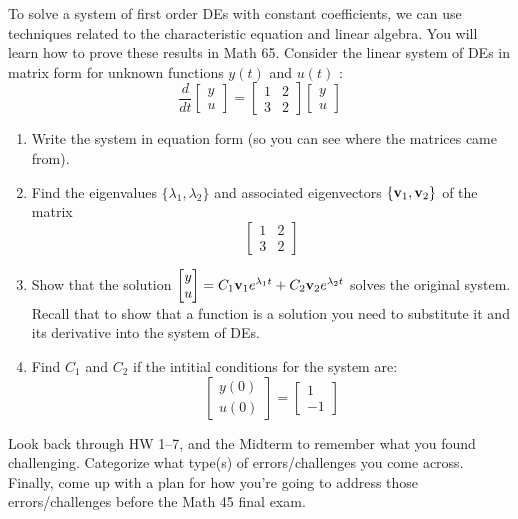 \begin{problem}[5]
To solve a system of first order DEs with constant coefficients, we can use techniques related to the characteristic equation and linear algebra. You will learn how to prove these results in Math 65. Consider the linear system of DEs in matrix form for unknown functions $y(t)$ and $u(t)$ :
\[\frac d{dt} \begin{bmatrix}y\\u\end{bmatrix} = \begin{bmatrix}1&2\\3&2\end{bmatrix} \begin{bmatrix}y\\u\end{bmatrix}\]

\begin{enumerate}
\item Write the system in equation form (so you can see where the matrices came from).
\item Find the eigenvalues $\{\lambda_1,\lambda_2\}$ and associated eigenvectors $\{\textbf{v}_1,\textbf{v}_2\}$ of the matrix
\[\begin{bmatrix}1&2\\3&2\end{bmatrix}\]
\item Show that the solution $\begin{bmatrix}y\\u\end{bmatrix} = C_1\textbf{v}_1e^{\lambda_1t} + C_2\textbf{v}_2e^{\lambda_2t}$ solves the original system. Recall that to show that a
function is a solution you need to substitute it and its derivative into the system of DEs.
\item Find $C_1$ and $C_2$ if the intitial conditions for the system are:
\[\begin{bmatrix}y(0)\\u(0)\end{bmatrix} = \begin{bmatrix}1\\-1\end{bmatrix}\]
\end{enumerate}
\end{problem}

\newpage


\begin{problem}[Review]
Look back through HW 1–7, and the Midterm to remember what you found challenging. Categorize what type(s) of errors/challenges you come across. Finally, come up with a plan for how you’re going to address those errors/challenges before the Math 45 final exam.
\end{problem}
